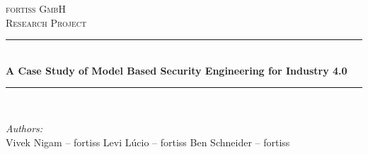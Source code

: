 \begin{titlepage}

\newcommand{\HRule}{\rule{\linewidth}{0.5mm}} %

\center %
 

\textsc{\LARGE fortiss GmbH}\\[1.5cm] %
\textsc{\Large Research Project}\\[0.5cm] %


\HRule \\[0.4cm]
{ \huge \bfseries A Case Study of Model Based Security Engineering for Industry 4.0}\\[0.4cm] %
\HRule \\[1cm]
 

\begin{minipage}{0.5\textwidth}
\begin{flushleft} \large
\emph{Authors:}\\
Vivek {Nigam} -- fortiss \qquad%
\qquad Levi L\'ucio -- fortiss \qquad \qquad
\qquad Ben Schneider -- fortiss 
\end{flushleft}
\end{minipage}
~
\begin{minipage}{0.4\textwidth}
\end{minipage}\\[1cm]



\end{titlepage}
